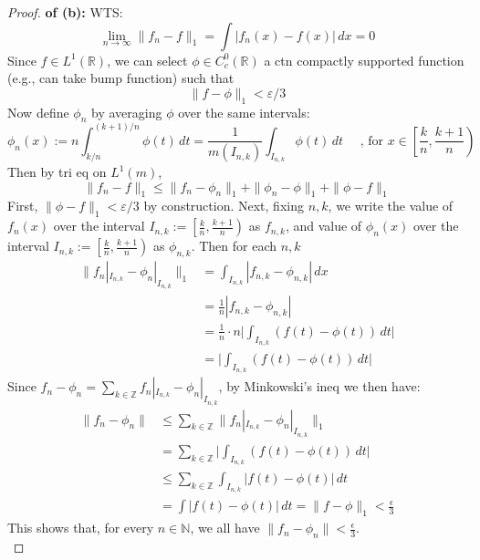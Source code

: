 \documentclass[lang=cn,11pt]{elegantbook}
\begin{document}
\begin{proof}
    \textbf{of (b):}
WTS:
\[
\lim_{n \to \infty} \|f_n - f\|_1 = \int |f_n(x) - f(x)|\,dx = 0
\]
Since $f \in L^1(\mathbb{R})$, we can select \( \phi \in C_c^0(\mathbb{R}) \) a ctn compactly supported function (e.g., can take bump function) such that
\[
\|f - \phi\|_1 < \varepsilon / 3
\]
Now define \( \phi_n \) by averaging \( \phi \) over the same intervals:
\[
\phi_n(x) := n \int_{k/n}^{(k+1)/n} \phi(t)\,dt = \frac{1}{m(I_{n,k})} \int_{I_{n,k}} \phi(t)\,dt\quad \text{ , for } x \in \left[\frac{k}{n}, \frac{k+1}{n}\right)
\]
Then by tri eq on $L^1(m)$, 
\[
\|f_n - f\|_1 \le \|f_n - \phi_n\|_1 + \|\phi_n - \phi\|_1 + \|\phi - f\|_1
\]
First, \(\|\phi - f\|_1 < \varepsilon /3\) by construction.
Next, fixing $n,k$, we write the value of $f_n(x)$ over the interval \( I_{n,k} := \left[\frac{k}{n}, \frac{k+1}{n}\right) \) as $f_{n,k}$, and value of $\phi_n(x)$ over the interval \( I_{n,k} := \left[\frac{k}{n}, \frac{k+1}{n}\right) \) as $\phi_{n,k}$. Then for each $n,k$
\begin{align*}
    \|f_n|_{I_{n,k}} - \phi_n|_{I_{n,k}}\|_1 &=  \int_{I_{n,k}}  |f_{n,k} -  \phi_{n,k}|\, dx\\
    &=  \frac{1}{n} |f_{n,k} -  \phi_{n,k}| \\
    &= \frac{1}{n}  \cdot n \bigg | \int_{I_{n,k}} (f(t) - \phi(t))\,dt \bigg| \\
    & = \bigg | \int_{I_{n,k}} (f(t) - \phi(t))\,dt  \bigg | 
\end{align*}
Since \(f_n - \phi_n = \sum_{k \in \mathbb{Z}} f_n|_{I_{n,k}} - \phi_n|_{I_{n,k}}\), by Minkowski's ineq we then have: 
\begin{align*}
\|f_n - \phi_n\| &\leq   \sum_{k\in \mathbb{Z}}  \|f_n|_{I_{n,k}} - \phi_n|_{I_{n,k}}\|_1 \\
&=\sum_{k\in \mathbb{Z}}   \bigg | \int_{I_{n,k}} (f(t) - \phi(t))\,dt  \bigg |  \\
& \leq \sum_{k\in \mathbb{Z}}   \int_{I_{n,k}} |f(t) - \phi(t)| \,dt  \\
&= \int |f(t) - \phi(t)| \,dt =     \| f-\phi \|_1 < \frac{\epsilon}{3}
\end{align*}
This shows that, for every $n\in \mathbb{N}$, we all have $\|f_n - \phi_n\|  < \frac{\epsilon}{3}$.\\


\end{proof}
\end{document}

